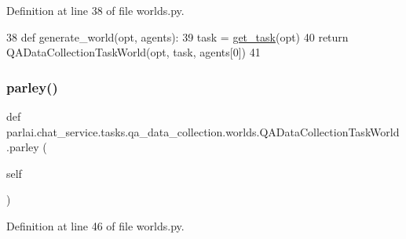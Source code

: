 Definition at line 38 of file worlds.\+py.


\begin{DoxyCode}
38     \textcolor{keyword}{def }generate\_world(opt, agents):
39         task = \hyperlink{namespaceparlai_1_1chat__service_1_1tasks_1_1qa__data__collection_1_1worlds_a2e51acfa39bb591f618ea3716f7d35e0}{get\_task}(opt)
40         \textcolor{keywordflow}{return} QADataCollectionTaskWorld(opt, task, agents[0])
41 
\end{DoxyCode}
\mbox{\label{classparlai_1_1chat__service_1_1tasks_1_1qa__data__collection_1_1worlds_1_1QADataCollectionTaskWorld_a2732be86dc4eba1255f5c27414f345d3}} 
\subsubsection{\texorpdfstring{parley()}{parley()}}
{\footnotesize\ttfamily def parlai.\+chat\+\_\+service.\+tasks.\+qa\+\_\+data\+\_\+collection.\+worlds.\+Q\+A\+Data\+Collection\+Task\+World.\+parley (\begin{DoxyParamCaption}\item[{}]{self }\end{DoxyParamCaption})}



Definition at line 46 of file worlds.\+py.


